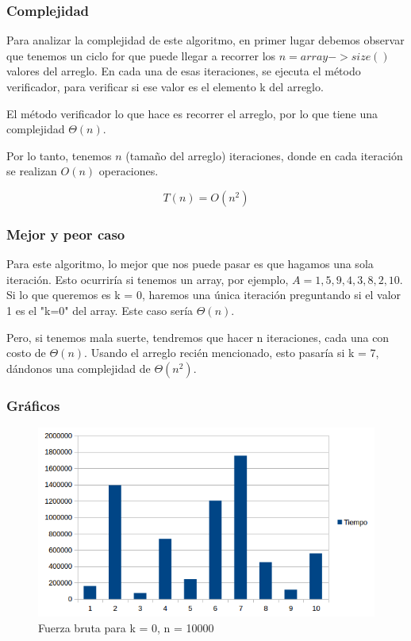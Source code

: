 \subsubsection{Complejidad}
Para analizar la complejidad de este algoritmo, en primer lugar debemos observar que tenemos un ciclo for que puede llegar a recorrer los $n = array->size()$ valores del arreglo. En cada una de esas iteraciones, se ejecuta el método verificador, para verificar si ese valor es el elemento k del arreglo.

El método verificador lo que hace es recorrer el arreglo, por lo que tiene una complejidad $\Theta(n)$.

Por lo tanto, tenemos $n$ (tamaño del arreglo) iteraciones, donde en cada iteración se realizan $O(n)$ operaciones.

$$ T(n) = O(n^2) $$

\subsubsection{Mejor y peor caso}
Para este algoritmo, lo mejor que nos puede pasar es que hagamos una sola iteración. Esto ocurriría si tenemos un array, por ejemplo, $ A = { 1, 5, 9, 4, 3, 8, 2, 10} $.
Si lo que queremos es k = 0, haremos una única iteración preguntando si el valor 1 es el "k=0" del array. Este caso sería $\Theta(n)$.

Pero, si tenemos mala suerte, tendremos que hacer n iteraciones, cada una con costo de $\Theta(n)$.
Usando el arreglo recién mencionado, esto pasaría si k = 7, dándonos una complejidad de $\Theta(n^2)$.

\subsubsection{Gráficos}
\begin{figure}[H]
\centering
\includegraphics[width=\textwidth]{KZero/BruteForceK0.png}
\caption{Fuerza bruta para k = 0, n = 10000}
\end{figure}

